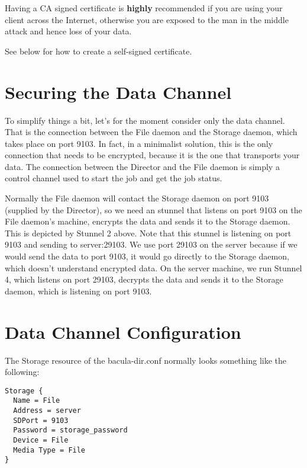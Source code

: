 Having a CA signed certificate is {\bf highly} recommended if you are using
your client across the Internet, otherwise you are exposed to the man in the
middle attack and hence loss of your data. 

See below for how to create a self-signed certificate. 

\section{Securing the Data Channel}

To simplify things a bit, let's for the moment consider only the data channel.
That is the connection between the File daemon and the Storage daemon, which
takes place on port 9103. In fact, in a minimalist solution, this is the only
connection that needs to be encrypted, because it is the one that transports your
data. The connection between the Director and the File daemon is simply a
control channel used to start the job and get the job status. 

Normally the File daemon will contact the Storage daemon on port 9103
(supplied by the Director), so we need an stunnel that listens on port 9103 on
the File daemon's machine, encrypts the data and sends it to the Storage
daemon. This is depicted by Stunnel 2 above. Note that this stunnel is
listening on port 9103 and sending to server:29103. We use port 29103 on the
server because if we would send the data to port 9103, it would go directly to the
Storage daemon, which doesn't understand encrypted data. On the server
machine, we run Stunnel 4, which listens on port 29103, decrypts the data and
sends it to the Storage daemon, which is listening on port 9103. 

\section{Data Channel Configuration}

The Storage resource of the bacula-dir.conf normally looks something like the
following: 

\footnotesize
\begin{verbatim}
Storage {
  Name = File
  Address = server
  SDPort = 9103
  Password = storage_password
  Device = File
  Media Type = File
}
\end{verbatim}
\normalsize

